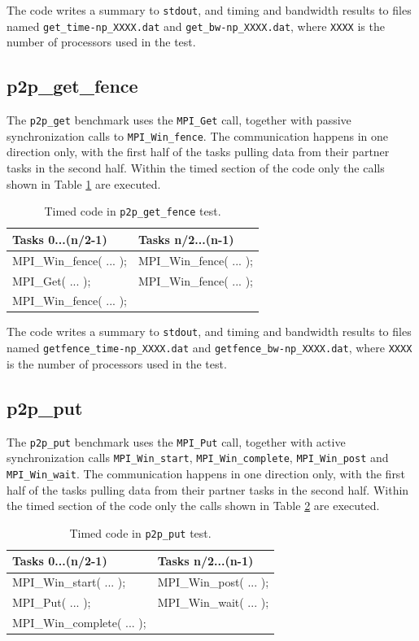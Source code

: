 \documentclass[10pt,a4paper]{report}
\begin{document}
The code writes a summary to \verb+stdout+, and timing and bandwidth results to files named \verb+get_time-np_XXXX.dat+ and \verb+get_bw-np_XXXX.dat+, where \verb+XXXX+ is the number of processors used in the test.

\FloatBarrier
\subsection{p2p\_get\_fence}
The \verb+p2p_get+ benchmark uses the \verb+MPI_Get+ call, together with passive synchronization calls to \verb+MPI_Win_fence+. The communication happens in one direction only, with the first half of the tasks pulling data from their partner tasks in the second half. Within the timed section of the code only the calls shown in Table \ref{tab:get_fence} are executed.

\begin{table}[ht]
\centering
\caption{Timed code in \texttt{p2p\_get\_fence} test.}
\label{tab:get_fence}
\begin{tabular}{|l|l|}
\hline
\bf{Tasks 0...(n/2-1)}	   & \bf{Tasks n/2...(n-1)}\\\hline
MPI\_Win\_fence( ... );    & MPI\_Win\_fence( ... );\\
MPI\_Get( ... );           & MPI\_Win\_fence( ... );\\
MPI\_Win\_fence( ... ); & \\\hline
\end{tabular}
\end{table}

The code writes a summary to \verb+stdout+, and timing and bandwidth results to files named \verb+getfence_time-np_XXXX.dat+ and \verb+getfence_bw-np_XXXX.dat+, where \verb+XXXX+ is the number of processors used in the test.

\FloatBarrier
\subsection{p2p\_put}
The \verb+p2p_put+ benchmark uses the \verb+MPI_Put+ call, together with active synchronization calls \verb+MPI_Win_start+, \verb+MPI_Win_complete+, \verb+MPI_Win_post+ and \verb+MPI_Win_wait+. The communication happens in one direction only, with the first half of the tasks pulling data from their partner tasks in the second half. Within the timed section of the code only the calls shown in Table \ref{tab:put} are executed.

\begin{table}[ht]
\centering
\caption{Timed code in \texttt{p2p\_put} test.}
\label{tab:put}
\begin{tabular}{|l|l|}
\hline
\bf{Tasks 0...(n/2-1)}	   & \bf{Tasks n/2...(n-1)}\\\hline
MPI\_Win\_start( ... );    & MPI\_Win\_post( ... );\\
MPI\_Put( ... );           & MPI\_Win\_wait( ... );\\
MPI\_Win\_complete( ... ); & \\\hline
\end{tabular}
\end{table}
\end{document}
